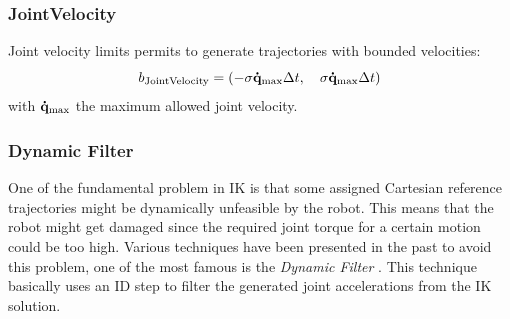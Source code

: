 \subsubsection{JointVelocity}
Joint velocity limits permits to generate trajectories with bounded velocities:
\begin{equation}
b_\text{JointVelocity} = \left( -\sigma \mathbf{\dot{q}}_\text{max}\Delta t,\quad \sigma \mathbf{\dot{q}}_\text{max}\Delta t \right)
\end{equation}
with $\mathbf{\dot{q}}_\text{max}$ the maximum allowed joint velocity.

\subsubsection{Dynamic Filter}
One of the fundamental problem in IK is that some assigned Cartesian reference trajectories might be dynamically unfeasible by the robot. This means that the robot might get damaged since the required joint torque for a certain motion could be too high. Various techniques have been presented in the past to avoid this problem, one of the most famous is the \emph{Dynamic Filter} \cite{Yamane:04}. This technique basically uses an ID step to filter the generated joint accelerations from the IK solution. 

